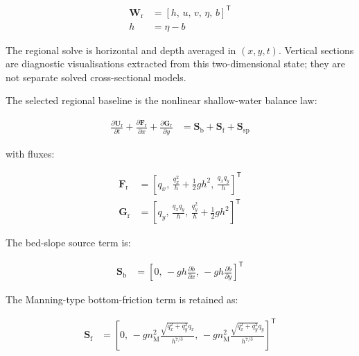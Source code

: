\begin{align}
  \mathbf{W}_{\mathrm{r}}
  &=
  \left[
    h,\,
    u,\,
    v,\,
    \eta,\,
    b
  \right]^{\mathsf{T}}
  \label{eq:res-mod-eqs-regional-primitive-state}
  \\
  h
  &=
  \eta
  -
  b
  \label{eq:res-mod-eqs-regional-depth-from-surface-bed}
\end{align}

The regional solve is horizontal and depth averaged in $(x,y,t)$.
Vertical sections are diagnostic visualisations extracted from this
two-dimensional state; they are not separate solved cross-sectional
models.

The selected regional baseline is the nonlinear shallow-water balance
law:

\begin{align}
  \frac{\partial \mathbf{U}_{\mathrm{r}}}{\partial t}
  +
  \frac{\partial \mathbf{F}_{\mathrm{r}}}{\partial x}
  +
  \frac{\partial \mathbf{G}_{\mathrm{r}}}{\partial y}
  &=
  \mathbf{S}_{\mathrm{b}}
  +
  \mathbf{S}_{\mathrm{f}}
  +
  \mathbf{S}_{\mathrm{sp}}
  \label{eq:res-mod-eqs-regional-nlswe-balance}
\end{align}

with fluxes:

\begin{align}
  \mathbf{F}_{\mathrm{r}}
  &=
  \left[
    q_x,\,
    \frac{q_x^2}{h}
    +
    \frac{1}{2}g h^2,\,
    \frac{q_x q_y}{h}
  \right]^{\mathsf{T}}
  \label{eq:res-mod-eqs-regional-x-flux}
  \\
  \mathbf{G}_{\mathrm{r}}
  &=
  \left[
    q_y,\,
    \frac{q_x q_y}{h},\,
    \frac{q_y^2}{h}
    +
    \frac{1}{2}g h^2
  \right]^{\mathsf{T}}
  \label{eq:res-mod-eqs-regional-y-flux}
\end{align}

The bed-slope source term is:

\begin{align}
  \mathbf{S}_{\mathrm{b}}
  &=
  \left[
    0,\,
    -g h \frac{\partial b}{\partial x},\,
    -g h \frac{\partial b}{\partial y}
  \right]^{\mathsf{T}}
  \label{eq:res-mod-eqs-regional-bed-slope-source}
\end{align}

The Manning-type bottom-friction term is retained as:

\begin{align}
  \mathbf{S}_{\mathrm{f}}
  &=
  \left[
    0,\,
    -g n_{\mathrm{M}}^2
    \frac{
      \sqrt{
        q_x^2
        +
        q_y^2
      }
      q_x
    }{
      h^{7/3}
    },\,
    -g n_{\mathrm{M}}^2
    \frac{
      \sqrt{
        q_x^2
        +
        q_y^2
      }
      q_y
    }{
      h^{7/3}
    }
  \right]^{\mathsf{T}}
  \label{eq:res-mod-eqs-regional-bottom-friction-source}
\end{align}

